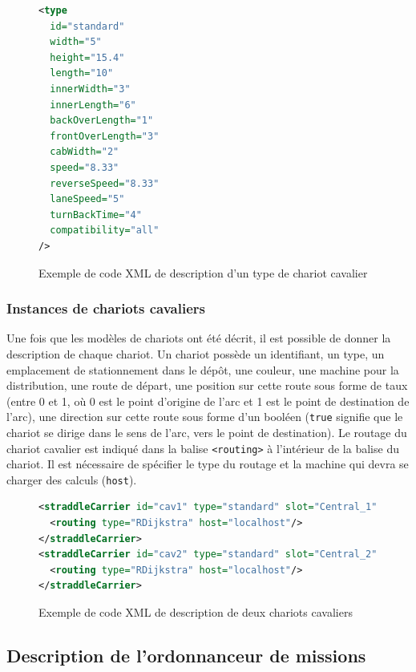 \begin{figure}[ht]
\centering
 \begin{lstlisting}[language=XML]
<type
  id="standard"
  width="5"
  height="15.4"
  length="10"
  innerWidth="3"
  innerLength="6"
  backOverLength="1"
  frontOverLength="3"
  cabWidth="2"
  speed="8.33"
  reverseSpeed="8.33"
  laneSpeed="5"
  turnBackTime="4"
  compatibility="all"
/>
\end{lstlisting}
\caption{Exemple de code XML de description d'un type de chariot cavalier}
\label{fig:simulation:typeChariot}
\end{figure}

\subsubsection{Instances de chariots cavaliers}

Une fois que les modèles de chariots ont été décrit, il est possible de donner la description de chaque chariot. Un chariot possède un identifiant, un type, un emplacement de stationnement dans le dépôt, une couleur, une machine pour la distribution, une route de départ, une position sur cette route sous forme de taux (entre 0 et 1, où 0 est le point d'origine de l'arc et 1 est le point de destination de l'arc), une direction sur cette route sous forme d'un booléen (\verb!true! signifie que le chariot se dirige dans le sens de l'arc, vers le point de destination). Le routage du chariot cavalier est indiqué dans la balise \verb!<routing>! à l'intérieur de la balise du chariot. Il est nécessaire de spécifier le type du routage et la machine qui devra se charger des calculs (\verb!host!).


\begin{figure}[ht]
\centering
 \begin{lstlisting}[language=XML]
<straddleCarrier id="cav1" type="standard" slot="Central_1" color="red" host="localhost" locationRoad="c2-c5" locationPourcent="0.5" direction="true">
  <routing type="RDijkstra" host="localhost"/>
</straddleCarrier>
<straddleCarrier id="cav2" type="standard" slot="Central_2" color="blue" host="localhost" locationRoad="B-4/38" locationPourcent="0.8" direction="true">
  <routing type="RDijkstra" host="localhost"/>
</straddleCarrier>
\end{lstlisting}
\caption{Exemple de code XML de description de deux chariots cavaliers}
\label{fig:simulation:chariot}
\end{figure}

\subsection{Description de l'ordonnanceur de missions}\label{sec:description:ordonnanceur}

